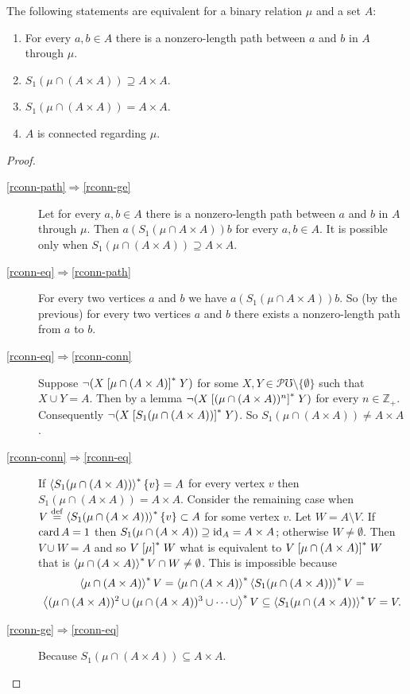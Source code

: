 \begin{thm}
The following statements are equivalent for a binary relation $\mu$
and a set $A$:
\begin{enumerate}
\item \label{rconn-path}For every $a,b\in A$ there is
a nonzero-length path between $a$ and $b$ in $A$ through $\mu$.
\item \label{rconn-ge}$S_1(\mu\cap(A\times A))\supseteq A\times A$.
\item \label{rconn-eq}$S_1(\mu\cap(A\times A))=A\times A$.
\item \label{rconn-conn}$A$ is connected regarding $\mu$.
\end{enumerate}
\end{thm}
\begin{proof}
~
\begin{description}
\item [{\ref{rconn-path}$\Rightarrow$\ref{rconn-ge}}] Let for every
$a,b\in A$ there is a nonzero-length path between $a$ and $b$ in $A$ through
$\mu$. Then $a\mathrel{(S_1(\mu\cap A\times A))}b$ for every $a,b\in A$.
It is possible only when $S_1(\mu\cap(A\times A))\supseteq A\times A$.
\item [{\ref{rconn-eq}$\Rightarrow$\ref{rconn-path}}] For every two
vertices $a$ and $b$ we have $a\mathrel{(S_1(\mu\cap A\times A))}b$.
So (by the previous) for every two vertices $a$ and $b$
there exists a nonzero-length path from $a$ to $b$.
\item [{\ref{rconn-eq}$\Rightarrow$\ref{rconn-conn}}] Suppose $\lnot(X\mathrel{\left[\mu\cap(A\times A)\right]^{\ast}}Y)$
for some $X,Y\in\mathscr{P}\mho\setminus\{\emptyset\}$ such that
$X\cup Y=A$. Then by a lemma $\lnot(X\mathrel{\left[(\mu\cap(A\times A))^{n}\right]^{\ast}}Y)$
for every $n\in\mathbb{Z}_+$. Consequently $\lnot(X\mathrel{\left[S_1(\mu\cap(A\times A))\right]^{\ast}}Y)$.
So $S_1(\mu\cap(A\times A))\ne A\times A$.
\item [{\ref{rconn-conn}$\Rightarrow$\ref{rconn-eq}}] If $\left\langle S_1(\mu\cap(A\times A))\right\rangle ^{\ast}\{v\}=A$
for every vertex $v$ then $S_1(\mu\cap(A\times A))=A\times A$. Consider
the remaining case when $V\overset{\mathrm{def}}{=}\left\langle S_1(\mu\cap(A\times A))\right\rangle ^{\ast}\{v\}\subset A$
for some vertex $v$. Let $W=A\setminus V$. If $\operatorname{card} A=1$ then
$S_1(\mu\cap(A\times A))\supseteq{\operatorname{id}}_{A}=A\times A$; otherwise $W\neq\emptyset$.
Then $V\cup W=A$ and so $V\mathrel{\left[\mu\right]^{\ast}}W$ what is equivalent to
$V\mathrel{\left[\mu\cap(A\times A)\right]^{\ast}}W$ that is $\left\langle \mu\cap(A\times A)\right\rangle ^{\ast}V\cap W\ne\emptyset$.
This is impossible because
\begin{multline*}
\left\langle \mu\cap(A\times A)\right\rangle ^{\ast}V=\left\langle \mu\cap(A\times A)\right\rangle ^{\ast}\left\langle S_1(\mu\cap(A\times A))\right\rangle ^{\ast}V=\\
\left\langle (\mu\cap(A\times A))^2\cup (\mu\cap(A\times A))^3\cup\dots\cup\right\rangle ^{\ast}V \subseteq
\left\langle S_1(\mu\cap(A\times A))\right\rangle ^{\ast}V=V.
\end{multline*}

\item [{\ref{rconn-ge}$\Rightarrow$\ref{rconn-eq}}] Because $S_1(\mu\cap(A\times A))\subseteq A\times A$.
\end{description}
\end{proof}
